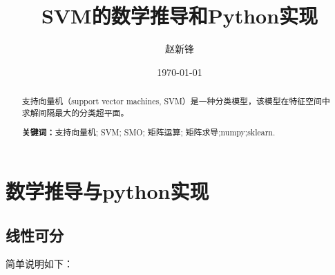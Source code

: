 \documentclass[12pt, a4paper, oneside]{ctexart}
\title{\textbf{SVM的数学推导和Python实现}}
\author{赵新锋}
\date{\today}
\begin{document}
\maketitle

\setcounter{page}{0}
\maketitle
\thispagestyle{empty}

\begin{abstract}
支持向量机（support vector machines, SVM）是一种分类模型，该模型在特征空间中求解间隔最大的分类超平面。
\par\textbf{关键词：}支持向量机; SVM; SMO; 矩阵运算; 矩阵求导;numpy;sklearn. 
\end{abstract}

\newpage
{}
\setcounter{page}{1}
\tableofcontents
\newpage
\setcounter{page}{1}


\newpage
\section{数学推导与python实现}

\subsection{线性可分}
简单说明如下：
\end{document}
